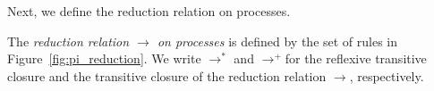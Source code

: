 Next, we define the reduction relation on processes. %
\begin{definition}
  The \emph{reduction relation $\to$ on %
    processes} is defined by the set of rules in Figure~\ref{fig:pi_reduction}.
    We write $\to^*$ and \( \to^+ \)for the reflexive transitive closure and the transitive closure of the reduction relation $\to$, respectively.
\end{definition}
\begin{figure}[tbp]
    \centering
    \small
    \begin{minipage}{\linewidth}
        \centering
        \begin{prooftree}
        \end{prooftree}
    \end{minipage}
    \begin{minipage}{0.48\linewidth}
        \centering
        \begin{prooftree}
        \end{prooftree}
    \end{minipage}
    \begin{minipage}{0.5\linewidth}
        \centering
        \begin{prooftree}
        \end{prooftree}
    \end{minipage}
    \begin{minipage}{\linewidth}
        \centering
        \begin{prooftree}
        \end{prooftree}

\end{minipage}
\end{figure}
